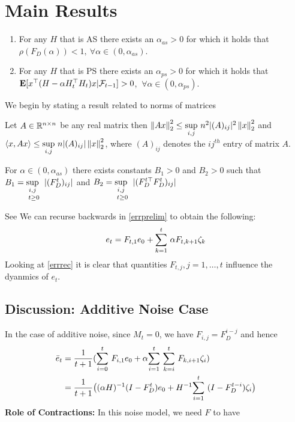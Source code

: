 \section{Main Results}
\begin{lemma}\label{addstep}
\begin{enumerate}[label=(\roman*)]
\item For any $H$ that is AS there exists an $\alpha_{as}>0$ for which it holds that $\rho(F_D(\alpha))<1,~\forall \alpha\in (0,\alpha_{as})$.
\item For any $H$ that is PS there exists an $\alpha_{ps}>0$ for which it holds that $\E[x^\top(H-\alpha H_t^\top H_t)x|\F_{t-1}]> 0$, $~\forall \alpha\in (0,\alpha_{ps})$.
\end{enumerate}
\end{lemma}
We begin by stating a result related to norms of matrices
\begin{lemma}
Let $A\in \R^{n\times n}$ be any real matrix then $\norm{Ax}^2_2\leq \us{\sup}{i,j}n^2|(A)_{ij}|^2\norm{x}^2_2$ and $\ip{x,Ax}\leq \us{\sup}{i,j}n|(A)_{ij}|\norm{x}^2_2$, where $(A)_{ij}$ denotes the $ij^{th}$ entry of matrix $A$.
\end{lemma}
\begin{lemma}
For $\alpha \in (0,\alpha_{as})$ there exists constants $B_1>0$ and $B_2>0$ such that $B_1=\us{\us{\sup}{i,j}}{t\geq 0}|(F_D^t)_{ij}|$ and $B_2=\us{\us{\sup}{i,j}}{t\geq 0}|(F_D^{t\top}F_D^t)_{ij}|$
\end{lemma}
See 
We can recurse backwards in \eqref{errprelim} to obtain the following:
\begin{align}\label{errrec}
e_t=F_{t,1}e_0+\ous{\sum}{k=1}{t}\alpha F_{t,k+1}\zeta_k
\end{align}
Looking at \eqref{errrec} it is clear that quantities $F_{t,j}, j=1,\ldots,t$ influence the dyanmics of $e_t$.
\subsection{Discussion: Additive Noise Case}
 In the case of additive noise, since $M_t=0$, we have $F_{i,j}=F^{i-j}_D$ and hence
\begin{align*}
\eb_t&=\frac{1}{t+1}(\ous{\sum}{i=0}{t} F_{i,1} e_0+ \alpha\ous{\sum}{i=1}{t} \ous{\sum}{k=i}{t} F_{k,i+1}  \zeta_i )\\
&=\frac{1}{t+1}\big((\alpha H)^{-1}(I-F_D^t)e_0+ H^{-1}\ous{\sum}{i=1}{t}(I-F_D^{t-i}) \zeta_i\big)
\end{align*}
\textbf{Role of Contractions:} In this noise model, we need $F$ to have
